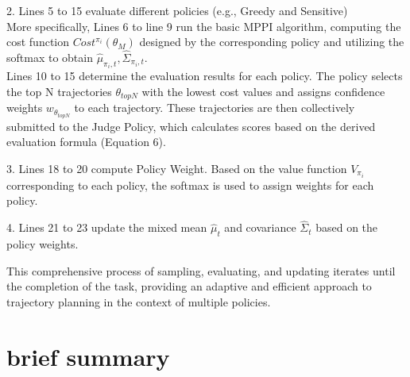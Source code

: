 \documentclass{article}
\begin{document}
2. Lines 5 to 15 evaluate different policies (e.g., Greedy and Sensitive) \\ More specifically,
Lines 6 to line 9 run the basic MPPI algorithm, computing the cost function $Cost^{\pi_i}(\theta_M)$ designed by the corresponding policy and  utilizing the softmax to obtain $\widehat{\mu}_{\pi_i,t}, \widehat{\Sigma}_{\pi_i,t}$. \\
Lines 10 to 15 determine the evaluation results for each policy. The policy selects the top N trajectories $\theta_{topN}$ with the lowest cost values and assigns confidence weights $w_{\theta_{topN}}$ to each trajectory. These trajectories are then collectively submitted to the Judge Policy, which calculates scores based on the derived evaluation formula (Equation 6).

3. Lines 18 to  20  compute Policy Weight.
Based on the value function $V_{\pi_i}$ corresponding to each policy, the softmax is used to assign weights for each policy.

4. Lines 21 to 23 update the mixed mean $\widehat{\mu}_t$ and covariance $\widehat{\Sigma}_t$ based on the policy weights.

This comprehensive process of sampling, evaluating, and updating iterates until the completion of the task, providing an adaptive and efficient approach to trajectory planning in the context of multiple policies.

\section{brief summary}
\end{document}
